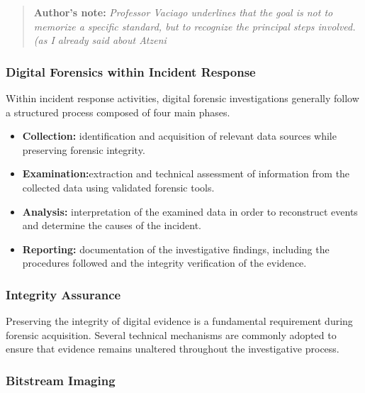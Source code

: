 \medskip

\begin{quotation}
  \textbf{Author's note:} \textit{ Professor Vaciago underlines that the goal is not to memorize a specific standard, but to recognize the principal steps involved. (as I already said about Atzeni}
\end{quotation}


\medskip


\subsubsection{Digital Forensics within Incident Response}

\noindent
Within incident response activities, digital forensic investigations generally follow a structured process composed of four main phases.

\medskip

\begin{itemize}
\item \textbf{Collection:} identification and acquisition of relevant data sources while preserving forensic integrity.
\item \textbf{Examination:}extraction and technical assessment of information from the collected data using validated forensic tools.
\item \textbf{Analysis:} interpretation of the examined data in order to reconstruct events and determine the causes of the incident.
\item \textbf{Reporting:} documentation of the investigative findings, including the procedures followed and the integrity verification of the evidence.
\end{itemize}

\subsubsection{Integrity Assurance}

\noindent
Preserving the integrity of digital evidence is a fundamental requirement during forensic acquisition. Several technical mechanisms are commonly adopted to ensure that evidence remains unaltered throughout the investigative process.

\medskip

\subsubsection*{Bitstream Imaging}

